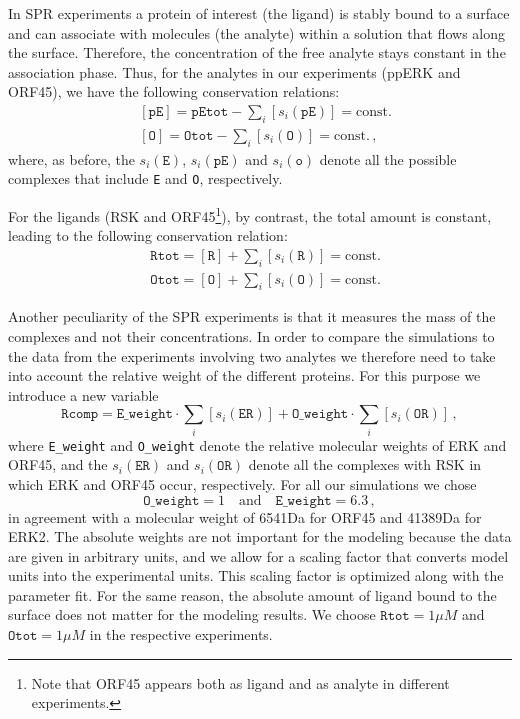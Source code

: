 \documentclass[12pt]{article}
\begin{document}
	In SPR experiments a protein of interest (the ligand) is stably bound
	to a surface and can associate with molecules (the analyte) within
	a solution that flows along the surface. Therefore, the concentration of the free analyte stays constant in the association phase. Thus, for the analytes in our experiments (ppERK and ORF45), we have
	the following conservation relations: 
	\begin{align}
		& [\texttt{pE}]=\texttt{pEtot}-\sum_{i}[s_{i}(\texttt{pE})]=\text{const.}\\
		& [\texttt{O}]=\texttt{Otot}-\sum_{i}[s_{i}(\texttt{O})]=\text{const.}\,,
	\end{align}
	where, as before, the $s_{i}(\texttt{E})$, $s_{i}(\texttt{pE})$
	and $s_{i}(\texttt{o})$ denote all the possible complexes that include
	\texttt{E} and \texttt{O}, respectively.
	
	For the ligands (RSK and ORF45\footnote{Note that ORF45 appears both as ligand and as analyte in different
		experiments.}), by contrast, the total amount is constant, leading to the following
	conservation relation: 
	\begin{align}
		& \texttt{Rtot}=[\texttt{R}]+\sum_{i}[s_{i}(\texttt{R})]=\text{const.}\\
		& \texttt{Otot}=[\texttt{O}]+\sum_{i}[s_{i}(\texttt{O})]=\text{const.}
	\end{align}
	
	Another peculiarity of the SPR experiments is that it measures
	the mass of the complexes and not their concentrations. In order to compare the simulations to the data from the experiments involving two analytes we therefore need to take into account the relative weight of the different proteins. For this purpose we introduce a new variable 
	\begin{equation}
		\texttt{Rcomp}=\texttt{E\_weight}\cdot\sum_{i}[s_{i}(\texttt{ER})]+\texttt{O\_weight}\cdot\sum_{i}[s_{i}(\texttt{OR})]\,,
	\end{equation}
	where \texttt{E\_weight} and \texttt{O\_weight} denote the relative
	molecular weights of ERK and ORF45, and the $s_{i}(\texttt{ER})$
	and $s_{i}(\texttt{OR})$ denote all the complexes with RSK in which
	ERK and ORF45 occur, respectively. For all our simulations we chose
	\begin{equation}
		\texttt{O\_weight}=1\quad\text{and}\quad\texttt{E\_weight}=6.3\,,
	\end{equation}
	in agreement with a molecular weight of 6541Da for ORF45 and 41389Da
	for ERK2. The absolute weights are not important for the modeling
	because the data are given in arbitrary units, and we allow for a
	scaling factor that converts model units into the experimental units.
	This scaling factor is optimized along with the parameter fit. For
	the same reason, the absolute amount of ligand bound to the surface
	does not matter for the modeling results. We choose $\texttt{Rtot}=1\mu M$
	and $\texttt{Otot}=1\mu M$ in the respective experiments.
	
\end{document}
